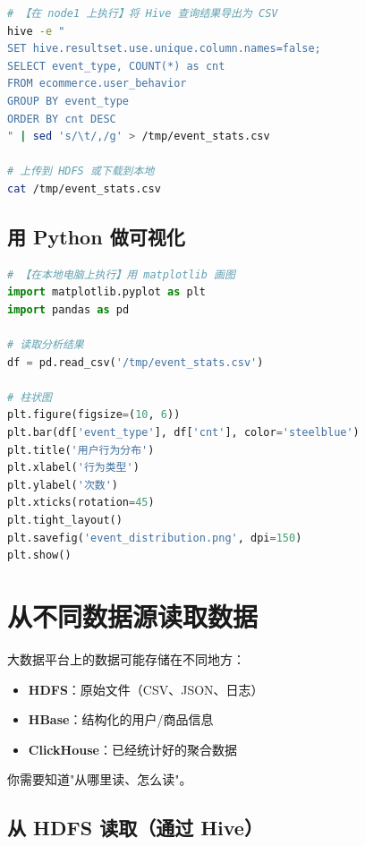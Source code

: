 \documentclass[12pt,a4paper]{article}
\begin{document}
\begin{lstlisting}[language=bash]
# 【在 node1 上执行】将 Hive 查询结果导出为 CSV
hive -e "
SET hive.resultset.use.unique.column.names=false;
SELECT event_type, COUNT(*) as cnt
FROM ecommerce.user_behavior
GROUP BY event_type
ORDER BY cnt DESC
" | sed 's/\t/,/g' > /tmp/event_stats.csv

# 上传到 HDFS 或下载到本地
cat /tmp/event_stats.csv
\end{lstlisting}

\subsection{用 Python 做可视化}

\begin{lstlisting}[language=Python]
# 【在本地电脑上执行】用 matplotlib 画图
import matplotlib.pyplot as plt
import pandas as pd

# 读取分析结果
df = pd.read_csv('/tmp/event_stats.csv')

# 柱状图
plt.figure(figsize=(10, 6))
plt.bar(df['event_type'], df['cnt'], color='steelblue')
plt.title('用户行为分布')
plt.xlabel('行为类型')
plt.ylabel('次数')
plt.xticks(rotation=45)
plt.tight_layout()
plt.savefig('event_distribution.png', dpi=150)
plt.show()
\end{lstlisting}



\section{从不同数据源读取数据}

\begin{knowledgebox}[为什么要学多种数据源？]
大数据平台上的数据可能存储在不同地方：
\begin{itemize}
    \item \textbf{HDFS}：原始文件（CSV、JSON、日志）
    \item \textbf{HBase}：结构化的用户/商品信息
    \item \textbf{ClickHouse}：已经统计好的聚合数据
\end{itemize}
你需要知道"从哪里读、怎么读"。
\end{knowledgebox}

\subsection{从 HDFS 读取（通过 Hive）}
\end{document}

